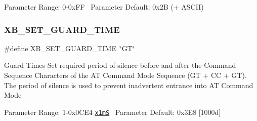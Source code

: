 Parameter Range\+: 0-\/0x\+FF~\newline
Parameter Default\+: 0x2B (\textquotesingle{}+\textquotesingle{} A\+S\+C\+II) \mbox{\label{group___a_t_command_options_ga87806745d2177177af3bc9da86cbdd2f}} 
\subsubsection{\texorpdfstring{X\+B\+\_\+\+S\+E\+T\+\_\+\+G\+U\+A\+R\+D\+\_\+\+T\+I\+ME}{XB\_SET\_GUARD\_TIME}}
{\footnotesize\ttfamily \#define X\+B\+\_\+\+S\+E\+T\+\_\+\+G\+U\+A\+R\+D\+\_\+\+T\+I\+ME~\char`\"{}GT\char`\"{}}

Guard Times Set required period of silence before and after the Command Sequence Characters of the AT Command Mode Sequence (GT + CC + GT). The period of silence is used to prevent inadvertent entrance into AT Command Mode

Parameter Range\+: 1-\/0x0\+C\+E4 \href{max of 3.3 decimal sec}{\tt x1mS}~\newline
Parameter Default\+: 0x3\+E8 \mbox{[}1000d\mbox{]} 